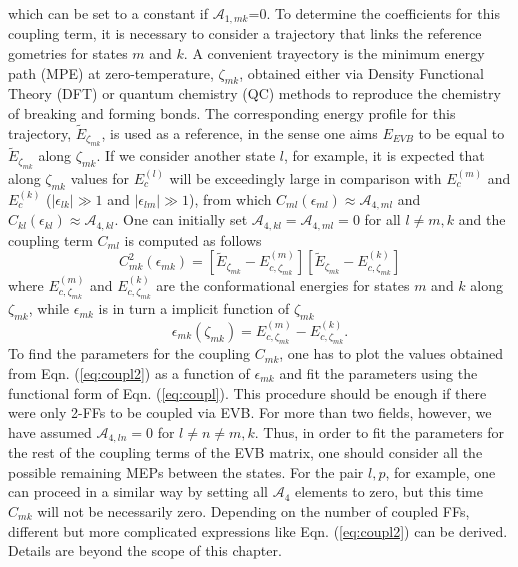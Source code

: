 which can be set to a constant if $\mathcal{A}_{1,mk}$=0. To determine the coefficients for this coupling term, it is necessary to consider a trajectory that links the reference gometries for states $m$ and $k$. A convenient trayectory is the minimum energy path (MPE) at zero-temperature, $\zeta_{mk}$, obtained either via Density Functional Theory (DFT) or quantum chemistry (QC) methods to reproduce the chemistry of breaking and forming bonds. The corresponding energy profile for this trajectory, $\tilde{E}_{\zeta_{mk}}$, is used as a reference, in the sense one aims $E_{EVB}$ to be equal to  $\tilde{E}_{\zeta_{mk}}$ along $\zeta_{mk}$. If we consider another state $l$, for example, it is expected that along $\zeta_{mk}$  values for $E^{(l)}_{c}$ will be exceedingly large in comparison with $E^{(m)}_{c}$ and $E^{(k)}_{c}$ ($|\epsilon_{lk}|\gg 1$ and $|\epsilon_{lm}|\gg 1$), from which $C_{ml}(\epsilon_{ml})\approx  \mathcal{A}_{4,ml}$ and $C_{kl}(\epsilon_{kl}) \approx \mathcal{A}_{4,kl}$. One can initially set $\mathcal{A}_{4,kl}=\mathcal{A}_{4,ml}=0$ for all $l\ne m, k$ and the coupling term $C_{ml}$ is computed as follows
\begin{equation}\label{eq:coupl2}
C^{2}_{mk}(\epsilon_{mk})=\left[ \tilde{E}_{\zeta_{mk}}-E^{(m)}_{c,\zeta_{mk}} \right] \left[ \tilde{E}_{\zeta_{mk}}-E^{(k)}_{c,\zeta_{mk}} \right]
\end{equation}
where $E^{(m)}_{c,\zeta_{mk}}$ and $E^{(k)}_{c,\zeta_{mk}}$ are the conformational energies for states $m$ and $k$ along $\zeta_{mk}$, while $\epsilon_{mk}$ is in turn a implicit function of $\zeta_{mk}$
\begin{equation}\label{eq:coupl3}
\epsilon_{mk}(\zeta_{mk})=E^{(m)}_{c,\zeta_{mk}}-E^{(k)}_{c,\zeta_{mk}}.
\end{equation}
To find the parameters for the coupling $C_{mk}$, one has to plot the values obtained from Eqn. (\ref{eq:coupl2}) as a function of $\epsilon_{mk}$ and fit the parameters using the functional form of Eqn. (\ref{eq:coupl}). This procedure should be enough if there were only 2-FFs to be coupled via EVB. For more than two fields, however, we have assumed $\mathcal{A}_{4,ln}=0$ for $l\ne n \ne m,k$. Thus, in order to fit the parameters for the rest of the coupling terms of the EVB matrix, one should consider all the possible remaining MEPs between the states. For the pair $l,p$, for example, one can proceed in a similar way by setting all $\mathcal{A}_{4}$ elements to zero, but this time $C_{mk}$ will not be necessarily zero. Depending on the number of coupled FFs, different but more complicated expressions like Eqn. (\ref{eq:coupl2}) can be derived. Details are beyond the scope of this chapter.\\
